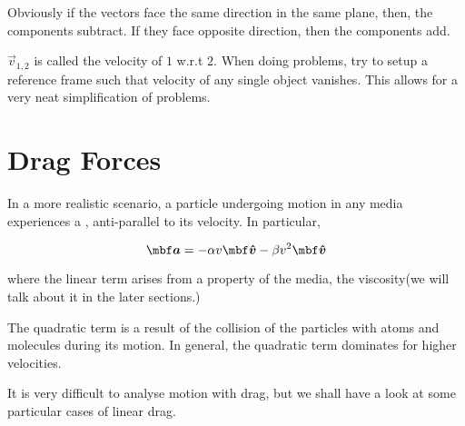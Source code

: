 Obviously if the vectors face the same direction in the same plane, then, the components subtract. If they face
opposite direction, then the components add. 

\(\vec{v}_{1,2}\) is called the velocity of \(\mathit{1}\) w.r.t \(\mathit{2}\). When doing
problems, try to setup a reference frame such that velocity of any single object vanishes.
This allows for a very neat simplification of problems. 

\section{Drag Forces}

In a more realistic scenario, a particle undergoing motion in any 
media experiences a , anti-parallel to its velocity.
In particular,  

\begin{equation*}
    \vec{a} = -\alpha v \unitv{v} - \beta v^2 \unitv{v}
\end{equation*}

where the linear term arises from a property of the media, 
the viscosity(we will talk about it in the later sections.)

The quadratic term is a result of the collision of the particles with atoms 
and molecules during its motion. In general, 
the quadratic term dominates for higher velocities.

It is very difficult to analyse motion with drag, but we shall have a look at some particular 
cases of linear drag.


